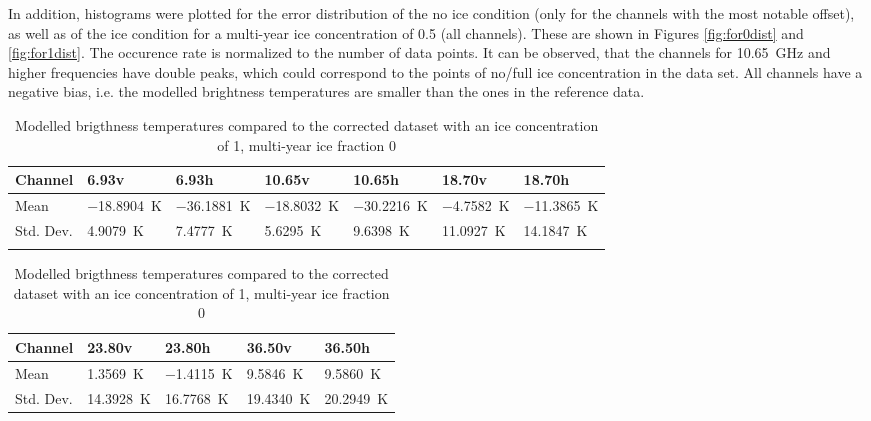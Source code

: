 \documentclass[11pt, a4paper]{article}
\begin{document}
In addition, histograms were plotted for the error distribution of the no ice condition (only for the channels with the most notable offset), as well as of the ice condition for a multi-year ice concentration of 0.5 (all channels). These are shown in Figures \ref{fig:for0dist} and \ref{fig:for1dist}. The occurence rate is normalized to the number of data points. It can be observed, that the channels for \SI{10.65}{GHz} and higher frequencies have double peaks, which could correspond to the points of no/full ice concentration in the data set. All channels have a negative bias, i.e. the modelled brightness temperatures are smaller than the ones in the reference data. \\

\begin{table}[h!]
\centering
\begin{tabular}{@{} l l l l l l l @{}}
Channel & 6.93v & 6.93h & 10.65v & 10.65h & 18.70v & 18.70h \\
\midrule
Mean & \SI{-18.8904}{K} & \SI{-36.1881}{K} & \SI{-18.8032}{K} & \SI{-30.2216}{K} & \SI{-4.7582}{K} & \SI{-11.3865}{K} \\
Std. Dev. & \SI{4.9079}{K} & \SI{7.4777}{K} & \SI{5.6295}{K} & \SI{9.6398}{K} & \SI{11.0927}{K} & \SI{14.1847}{K} \\
\midrule
\tabularnewline
\end{tabular}
\begin{tabular}{@{} l l l l l @{}}
Channel & 23.80v & 23.80h & 36.50v & 36.50h \\
\midrule
Mean & \SI{1.3569}{K} & \SI{-1.4115}{K} & \SI{9.5846}{K} & \SI{9.5860}{K} \\
Std. Dev. & \SI{14.3928}{K} & \SI{16.7768}{K} & \SI{19.4340}{K} & \SI{20.2949}{K} \\
\midrule
\end{tabular}
\caption{Modelled brigthness temperatures compared to the corrected dataset with an ice concentration of 1, multi-year ice fraction 0}
\label{tab:for1_0}
\end{table}
\end{document}
